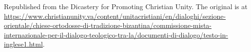 \documentclass[11pt,letterpaper]{article}
\begin{document}
\color{ink}



\vspace{2em}
{\small\noindent Republished from the Dicastery for Promoting Christian Unity. The
original is at
\url{https://www.christianunity.va/content/unitacristiani/en/dialoghi/sezione-orientale/chiese-ortodosse-di-tradizione-bizantina/commissione-mista-internazionale-per-il-dialogo-teologico-tra-la/documenti-di-dialogo/testo-in-inglese1.html}.\par}
\end{document}
